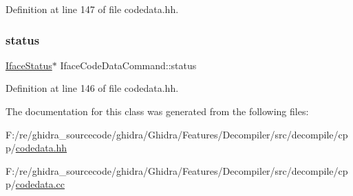 Definition at line 147 of file codedata.\+hh.

\mbox{\label{class_iface_code_data_command_a8bc924bbcfedad566608dfda1ff4432c}} 
\subsubsection{\texorpdfstring{status}{status}}
{\footnotesize\ttfamily \mbox{\hyperlink{class_iface_status}{Iface\+Status}}$\ast$ Iface\+Code\+Data\+Command\+::status\hspace{0.3cm}{\ttfamily [protected]}}



Definition at line 146 of file codedata.\+hh.



The documentation for this class was generated from the following files\+:\begin{DoxyCompactItemize}
\item 
F\+:/re/ghidra\+\_\+sourcecode/ghidra/\+Ghidra/\+Features/\+Decompiler/src/decompile/cpp/\mbox{\hyperlink{codedata_8hh}{codedata.\+hh}}\item 
F\+:/re/ghidra\+\_\+sourcecode/ghidra/\+Ghidra/\+Features/\+Decompiler/src/decompile/cpp/\mbox{\hyperlink{codedata_8cc}{codedata.\+cc}}\end{DoxyCompactItemize}
